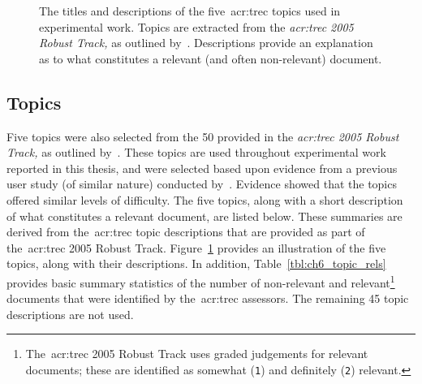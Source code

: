 \begin{figure}[t!]
    \centering
    \caption[TREC topic titles and descriptions]{The titles and descriptions of the five~\gls{acr:trec} topics used in experimental work. Topics are extracted from the \emph{\gls{acr:trec} 2005 Robust Track,} as outlined by~\cite{voorhees2006trec_robust}. Descriptions provide an explanation as to what constitutes a relevant (and often non-relevant) document.}
    \label{fig:topics}
\end{figure}

\subsection{Topics}\label{sec:methodology:collection:topics}
Five topics were also selected from the 50 provided in the \emph{\gls{acr:trec} 2005 Robust Track,} as outlined by~\cite{voorhees2006trec_robust}. These topics are used throughout experimental work reported in this thesis, and were selected based upon evidence from a previous user study (of similar nature) conducted by~\cite{kelly2009user_study}. Evidence showed that the topics offered similar levels of difficulty. The five topics, along with a short description of what constitutes a relevant document, are listed below. These summaries are derived from the~\gls{acr:trec} topic descriptions that are provided as part of the~\gls{acr:trec} 2005 Robust Track. Figure~\ref{fig:topics} provides an illustration of the five topics, along with their descriptions. In addition, Table~\ref{tbl:ch6_topic_rels} provides basic summary statistics of the number of non-relevant and relevant\footnote{The~\gls{acr:trec} 2005 Robust Track uses graded judgements for relevant documents; these are identified as somewhat (\texttt{1}) and definitely (\texttt{2}) relevant.} documents that were identified by the~\gls{acr:trec} assessors. The remaining 45 topic descriptions are not used.

